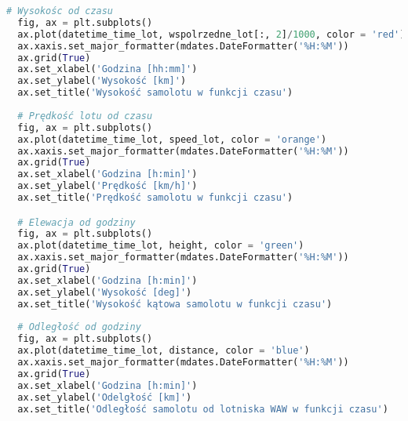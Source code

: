 \documentclass[fleqn,10pt,a4paper]{article}
\begin{document}
\begin{lstlisting}[language=Python, caption=Wykresy położenia samolotu od czasu, label = wykresy]
  # Wysokośc od czasu
  fig, ax = plt.subplots()
  ax.plot(datetime_time_lot, wspolrzedne_lot[:, 2]/1000, color = 'red')
  ax.xaxis.set_major_formatter(mdates.DateFormatter('%H:%M'))
  ax.grid(True)
  ax.set_xlabel('Godzina [hh:mm]')
  ax.set_ylabel('Wysokość [km]')
  ax.set_title('Wysokość samolotu w funkcji czasu')
  
  # Prędkość lotu od czasu
  fig, ax = plt.subplots()
  ax.plot(datetime_time_lot, speed_lot, color = 'orange')
  ax.xaxis.set_major_formatter(mdates.DateFormatter('%H:%M'))
  ax.grid(True)
  ax.set_xlabel('Godzina [h:min]')
  ax.set_ylabel('Prędkość [km/h]')
  ax.set_title('Prędkość samolotu w funkcji czasu')

  # Elewacja od godziny
  fig, ax = plt.subplots()
  ax.plot(datetime_time_lot, height, color = 'green')
  ax.xaxis.set_major_formatter(mdates.DateFormatter('%H:%M'))
  ax.grid(True)
  ax.set_xlabel('Godzina [h:min]')
  ax.set_ylabel('Wysokość [deg]')
  ax.set_title('Wysokość kątowa samolotu w funkcji czasu')
  
  # Odległość od godziny
  fig, ax = plt.subplots()
  ax.plot(datetime_time_lot, distance, color = 'blue')
  ax.xaxis.set_major_formatter(mdates.DateFormatter('%H:%M'))
  ax.grid(True)
  ax.set_xlabel('Godzina [h:min]')
  ax.set_ylabel('Odelgłość [km]')
  ax.set_title('Odległość samolotu od lotniska WAW w funkcji czasu')
\end{lstlisting}

\newpage
\listoftables
\listoffigures
\lstlistoflistings
\end{document}
